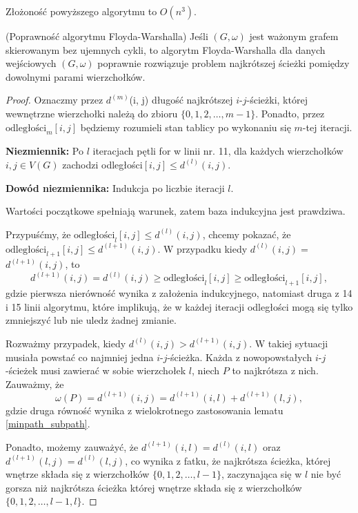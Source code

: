 Złożoność powyższego algorytmu to $O(n^3)$.

\begin{theorem}{(Poprawność algorytmu Floyda-Warshalla)}
	Jeśli $(G, \omega)$ jest ważonym grafem skierowanym
	bez ujemnych cykli, to algorytm Floyda-Warshalla dla 
	danych wejściowych $(G, \omega)$ poprawnie
	rozwiązuje problem najkrótszej ścieżki 
	pomiędzy dowolnymi parami wierzchołków.
	
	\begin{proof}
		Oznaczmy przez $d^{(m)}$(i, j) długość najkrótszej
		$i$-$j$-ścieżki, której wewnętrzne wierzchołki 
		należą do zbioru $\{0, 1, 2, \dots, m-1\}$. 
		Ponadto, przez
		$\text{odległości}_{m}[i, j]$ będziemy rozumieli 
		stan tablicy po 
		wykonaniu się $m$-tej iteracji.
		
		\textbf{Niezmiennik:} Po $l$ iteracjach 
		pętli for w linii nr. 11, dla każdych wierzchołków
		$i, j \in V(G)$ zachodzi odległości$[i,j] \leq d^{(l)}(i,j)$.
		
		\textbf{Dowód niezmiennika:} Indukcja po liczbie iteracji $l$.
		
		Wartości początkowe spełniają warunek, zatem
		baza indukcyjna jest prawdziwa. 
		
		Przypuśćmy, że $\text{odległości}_{l}[i, j] \leq
		d^{(l)}(i, j)$, chcemy pokazać, że 
		$\text{odległości}_{l+1}[i, j] \leq$$ d^{(l+1)}(i, j)$.
		W przypadku kiedy $d^{(l)}(i,j) =$$ d^{(l+1)}(i,j)$, to
		\[d^{(l+1)}(i,j) = d^{(l)}(i, j) \geq 
		\text{odległości}_l[i, j] \geq \text{odległości}_{l+1}[i, j],\]
		gdzie pierwsza nierówność wynika z założenia indukcyjnego, natomiast
		druga z 14 i 15 linii algorytmu, które implikują, że
		w każdej iteracji odległości mogą się tylko zmniejszyć lub
		nie uledz żadnej zmianie.
		
		Rozważmy przypadek, kiedy $d^{(l)}(i,j) >$$ d^{(l+1)}(i,j)$. 
		W takiej sytuacji musiała powstać co najmniej jedna 
		$i$-$j$-ścieżka. Każda z nowopowstałych $i$-$j$-ścieżek
		musi zawierać w sobie wierzchołek $l$, niech 
		$P$ to najkrótsza z nich. Zauważmy, że
		\[\omega(P) = d^{(l+1)}(i, j) = 
		d^{(l+1)}(i, l) + d^{(l+1)}(l, j),\]
		gdzie druga równość wynika z wielokrotnego zastosowania 
		lematu \ref{minpath_subpath}.
		
		Ponadto, możemy zauważyć, że $d^{(l+1)}(i, l) = d^{(l)}(i, l)$ 
		oraz $d^{(l+1)}(l, j) = d^{(l)}(l, j)$, co wynika z fatku, że
		najkrótsza ścieżka, której wnętrze składa się z wierzchołków 
		$\{0, 1, 2, \dots, l-1\}$, zaczynająca się w $l$ 
		nie być gorsza niż najkrótsza ścieżka której 
		wnętrze składa się z wierzchołków 
		$\{0, 1, 2, \dots, l-1, l\}$.
		

\end{proof}
\end{theorem}
